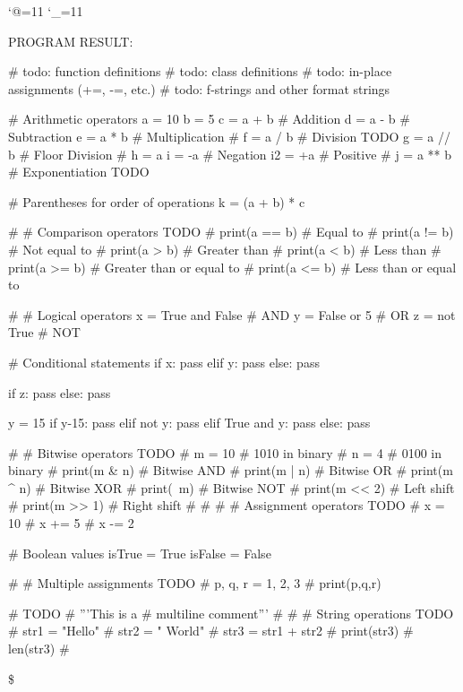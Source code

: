 \let\e\expandafter
\catcode`@=11
\catcode`_=11

\def\@pytexError#1{%
	\errmessage{#1}%
}










\def\@pytexChar@Backslash{\loggingall\@pytexParser@parse}
\let\@pytexChar@Dollar\bye

\def\@pytexChar@DoubleQuote{\relax}
\def\@pytexChar@SingleQuote{\relax}


%

PROGRAM RESULT:

\@pytexMakeAllActive

# todo: function definitions
# todo: class definitions
# todo: in-place assignments (+=, -=, etc.)
# todo: f-strings and other format strings


# Arithmetic operators
a = 10
b = 5
c = a + b  # Addition
d = a - b  # Subtraction
e = a * b  # Multiplication
# f = a / b  # Division TODO
g = a // b # Floor Division
# h = a %
i = -a     # Negation
i2 = +a    # Positive
# j = a ** b # Exponentiation TODO


# Parentheses for order of operations
k = (a + b) * c

# # Comparison operators TODO
# print(a == b)  # Equal to
# print(a != b)  # Not equal to
# print(a > b)   # Greater than
# print(a < b)   # Less than
# print(a >= b)  # Greater than or equal to
# print(a <= b)  # Less than or equal to


# # Logical operators
x = True and False  # AND
y = False or 5   # OR
z = not True        # NOT


# Conditional statements
if x:
    pass
elif y:
    pass
else:
    pass


if z:
    pass
else:
    pass

y = 15
if y-15:
    pass
elif not y:
	pass
elif True and y:
    pass
else:
    pass


# # Bitwise operators TODO
# m = 10  # 1010 in binary
# n = 4   # 0100 in binary
# print(m & n)  # Bitwise AND
# print(m | n)  # Bitwise OR
# print(m ^ n)  # Bitwise XOR
# print(~m)   # Bitwise NOT
# print(m << 2) # Left shift
# print(m >> 1) # Right shift
# 
# 
# # Assignment operators TODO
# x = 10
# x += 5
# x -= 2

# Boolean values
isTrue = True
isFalse = False

# # Multiple assignments TODO
# p, q, r = 1, 2, 3
# print(p,q,r)

# TODO
# '''This is a
# multiline comment'''
# 
# 
# String operations TODO
# str1 = "Hello"
# str2 = " World"
# str3 = str1 + str2
# print(str3)
# len(str3)
# 

\$
\bye
